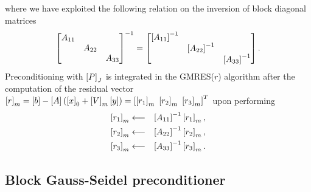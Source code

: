 \noindent where we have exploited the following relation on the inversion of block diagonal matrices
$$ 
\begin{bmatrix}
A_{11} &  & \\
 & A_{22} & \\
 & & A_{33}
\end{bmatrix}^{-1} = 
\begin{bmatrix}
\left[A_{11}\right]^{-1} &  & \\
 & \left[A_{22}\right]^{-1} & \\
 & & \left[A_{33}\right]^{-1}
\end{bmatrix}.
$$
\noindent Preconditioning with $\left[P\right]_{J}$ is integrated in the GMRES($r$) algorithm after the computation of the residual vector $\vect{r}_m = \vect{b} - \mat{A} (\vect{x}_0 + \mat{V}_m \vect{y}) = \vect{\vect{r_1}_m \ \vect{r_2}_m \ \vect{r_3}_m}^T$ upon performing
\begin{eqnarray*}
\left[{{r_1}}\right]_m &\longleftarrow & \left[A_{11}\right]^{-1}\left[{{r_1}}\right]_m, \\
\left[{{r_2}}\right]_m &\longleftarrow & \left[A_{22}\right]^{-1}\left[{{r_2}}\right]_m, \\
\left[{{r_3}}\right]_m &\longleftarrow & \left[A_{33}\right]^{-1}\left[{{r_3}}\right]_m. 
\end{eqnarray*}

\subsection{Block Gauss-Seidel preconditioner} \label{sec:GS}

